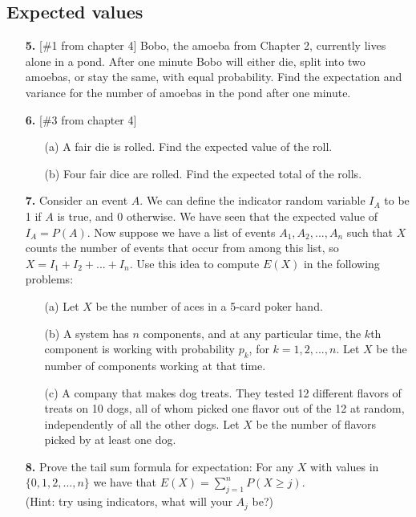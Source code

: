 \documentclass{article}
\begin{document}
\subsection*{Expected values}

\begin{enumerate}
    \setcounter{enumi}{4} %
    \item[\textbf{5.}] [\#1 from chapter 4] Bobo, the amoeba from Chapter 2, currently lives alone in a pond. After one minute Bobo will either die, split into two amoebas, or stay the same, with equal probability. Find the expectation and variance for the number of amoebas in the pond after one minute.

    \item[\textbf{6.}] [\#3 from chapter 4]
    \begin{enumerate}
        \item[(a)] A fair die is rolled. Find the expected value of the roll.
        \item[(b)] Four fair dice are rolled. Find the expected total of the rolls.
    \end{enumerate}

    \item[\textbf{7.}] Consider an event $A$. We can define the indicator random variable $I_{A}$ to be 1 if $A$ is true, and 0 otherwise. We have seen that the expected value of $I_{A}=P(A)$. Now suppose we have a list of events $A_{1},A_{2},...,A_{n}$ such that $X$ counts the number of events that occur from among this list, so $X = I_{1}+I_{2}+...+I_{n}$. Use this idea to compute $E(X)$ in the following problems:
    \begin{enumerate}
        \item[(a)] Let $X$ be the number of aces in a 5-card poker hand.
        \item[(b)] A system has $n$ components, and at any particular time, the $k$th component is working with probability $p_{k}$, for $k=1,2,...,n$. Let $X$ be the number of components working at that time.
        \item[(c)] A company that makes dog treats. They tested 12 different flavors of treats on 10 dogs, all of whom picked one flavor out of the 12 at random, independently of all the other dogs. Let $X$ be the number of flavors picked by at least one dog.
    \end{enumerate}

    \item[\textbf{8.}] Prove the tail sum formula for expectation: For any $X$ with values in $\{0,1,2,...,n\}$ we have that $E(X)=\sum_{j=1}^{n}P(X\ge j)$. \\
    (Hint: try using indicators, what will your $A_{j}$ be?)
\end{enumerate}
\end{document}
